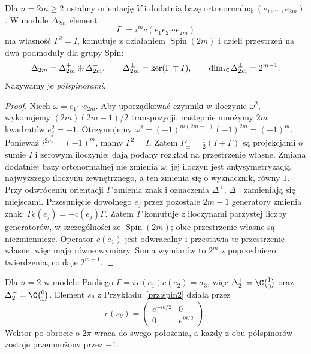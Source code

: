 \begin{stwierdzenie}
\label{prop:spin-chiral}
Dla $n=2m\geq2$ ustalmy orientację $V$ i dodatnią bazę
ortonormalną $(e_1,\ldots,e_{2m})$. W module $\Delta_{2m}$
element
\[
 \Gamma:=i^m c(e_1e_2\cdots e_{2m})
\]
ma własność $\Gamma^2=I$, komutuje z działaniem
$\operatorname{Spin}(2m)$ i dzieli przestrzeń
na dwa podmoduły dla grupy Spin:
\[
 \Delta_{2m}=\Delta^+_{2m}\oplus\Delta^-_{2m},
 \qquad
 \Delta^\pm_{2m}=\ker(\Gamma\mp I),\qquad
 \dim_\C\Delta^\pm_{2m}=2^{m-1}.
\]
Nazywamy je \emph{półspinorami}.
\end{stwierdzenie}
\begin{proof}
Niech $\omega=e_1\cdots e_{2m}$. Aby uporządkować czynniki
w iloczynie $\omega^2$, wykonujemy $(2m)(2m-1)/2$ transpozycji;
następnie mnożymy $2m$ kwadratów $e_j^2=-1$.
Otrzymujemy
$\omega^2=(-1)^{m(2m-1)}(-1)^{2m}=(-1)^m$.
Ponieważ $i^{2m}=(-1)^m$, mamy $\Gamma^2=I$.
Zatem $P_\pm=\tfrac12(I\pm\Gamma)$ są projekcjami
o sumie $I$ i zerowym iloczynie; dają podany rozkład na przestrzenie własne.
Zmiana dodatniej bazy ortonormalnej nie zmienia $\omega$:
jej iloczyn jest antysymetryzacją najwyższego iloczynu zewnętrznego,
a ten zmienia się o wyznacznik, równy $1$.
Przy odwróceniu orientacji $\Gamma$ zmienia znak i oznaczenia
$\Delta^+$, $\Delta^-$ zamieniają się miejscami.
Przesunięcie dowolnego $e_j$ przez pozostałe
$2m-1$ generatory zmienia znak:
$\Gamma c(e_j)=-c(e_j)\Gamma$.
Zatem $\Gamma$ komutuje z iloczynami
parzystej liczby generatorów, w szczególności
ze $\operatorname{Spin}(2m)$; obie przestrzenie
własne są niezmiennicze. Operator
$c(e_1)$ jest odwracalny i przestawia
te przestrzenie własne, więc mają równe
wymiary. Suma wymiarów to $2^m$ z poprzedniego
twierdzenia, co daje $2^{m-1}$.
\end{proof}

\begin{przyklad}
Dla $n=2$ w modelu Pauliego
$\Gamma=i\,c(e_1)c(e_2)=\sigma_3$,
więc $\Delta^+_2=\C\binom10$ oraz
$\Delta^-_2=\C\binom01$.
Element $s_\theta$ z Przykładu~\ref{prz:spin2}
działa przez
\[
 c(s_\theta)=
 \begin{pmatrix}
  e^{-i\theta/2}&0\\0&e^{i\theta/2}
 \end{pmatrix}.
\]
Wektor po obrocie o $2\pi$ wraca do swego
położenia, a każdy z obu półspinorów
zostaje przemnożony przez $-1$.
\end{przyklad}

